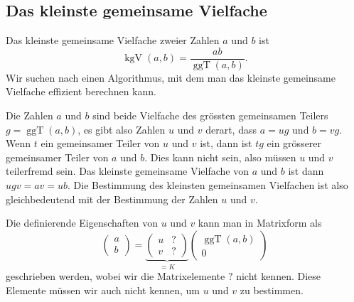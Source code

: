 %
%
\subsection{Das kleinste gemeinsame Vielfache
\label{buch:subsection:daskgv}}
Das kleinste gemeinsame Vielfache zweier Zahlen $a$ und $b$ ist
\[
\operatorname{kgV}(a,b)
=
\frac{ab}{\operatorname{ggT}(a,b)}.
\]
Wir suchen nach einen Algorithmus, mit dem man das kleinste gemeinsame
Vielfache effizient berechnen kann.

Die Zahlen $a$ und $b$ sind beide Vielfache des grössten gemeinsamen
Teilers $g=\operatorname{ggT}(a,b)$, es gibt also Zahlen $u$ und $v$ derart,
dass $a=ug$ und $b=vg$.
Wenn $t$ ein gemeinsamer Teiler von $u$ und $v$ ist, dann ist $tg$ ein
grösserer gemeinsamer Teiler von $a$ und $b$.
Dies kann nicht sein, also müssen $u$ und $v$ teilerfremd sein.
Das kleinste gemeinsame Vielfache von $a$ und $b$ ist dann $ugv=av=ub$.
Die Bestimmung des kleinsten gemeinsamen Vielfachen ist also gleichbedeutend
mit der Bestimmung der Zahlen $u$ und $v$.

Die definierende Eigenschaften von $u$ und $v$ kann man in Matrixform als
\begin{equation}
\begin{pmatrix}
a\\b
\end{pmatrix}
=
\underbrace{
\begin{pmatrix}
u&?\\
v&?
\end{pmatrix}}_{\displaystyle =K}
\begin{pmatrix}
\operatorname{ggT}(a,b)\\ 0
\end{pmatrix}
\label{buch:eindlichekoerper:eqn:uvmatrix}
\end{equation}
geschrieben werden, wobei wir die Matrixelemente $?$ nicht kennen.
Diese Elemente müssen wir auch nicht kennen, um $u$ und $v$ zu bestimmen.

